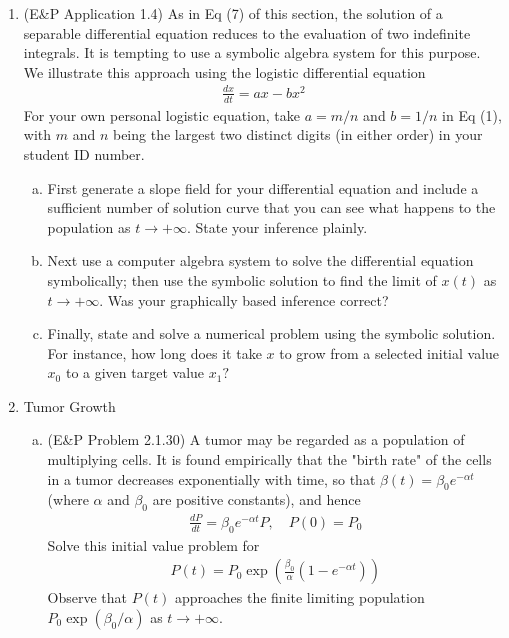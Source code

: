 \documentclass{article}
\begin{document}
\begin{enumerate}
\begin{enumerate}[(a)]
		\end{enumerate}

	\item (E\&P Application 1.4) As in Eq (7) of this section, the solution of a separable differential equation reduces to the evaluation of two indefinite integrals. It is tempting to use a symbolic algebra system for this purpose. We illustrate this approach using the logistic differential equation
		\begin{align*}
			\frac{dx}{dt} = ax-bx^2 \tag{1}
		\end{align*}
		For your own personal logistic equation, take $a=m/n$ and $b=1/n$ in Eq (1), with $m$ and $n$ being the largest two distinct digits (in either order) in your student ID number.
		\begin{enumerate}[(a)]
			\item First generate a slope field for your differential equation and include a sufficient number of solution curve that you can see what happens to the population as $t\to+\infty.$ State your inference plainly.

			\item Next use a computer algebra system to solve the differential equation symbolically; then use the symbolic solution to find the limit of $x(t)$ as $t\to+\infty.$ Was your graphically based inference correct?

			\item Finally, state and solve a numerical problem using the symbolic solution. For instance, how long does it take $x$ to grow from a selected initial value $x_0$ to a given target value $x_1?$
				
		\end{enumerate}

	\item Tumor Growth
		\begin{enumerate}[(a)]
			\item (E\&P Problem 2.1.30) A tumor may be regarded as a population of multiplying cells. It is found empirically that the "birth rate" of the cells in a tumor decreases exponentially with time, so that $\beta(t)=\beta_0e^{-\alpha t}$ (where $\alpha$ and $\beta_0$ are positive constants), and hence
				\begin{align*}
					\frac{dP}{dt} = \beta_0 e^{-\alpha t}P, \quad P(0)=P_0
				\end{align*}
				Solve this initial value problem for
				\begin{align*}
					P(t)=P_0\exp\left( \frac{\beta_0}{\alpha}\left( 1-e^{-\alpha t} \right) \right)
				\end{align*}
				Observe that $P(t)$ approaches the finite limiting population $P_0\exp(\beta_0/\alpha)$ as $t\to+\infty.$


\end{enumerate}
\end{enumerate}
\end{document}
